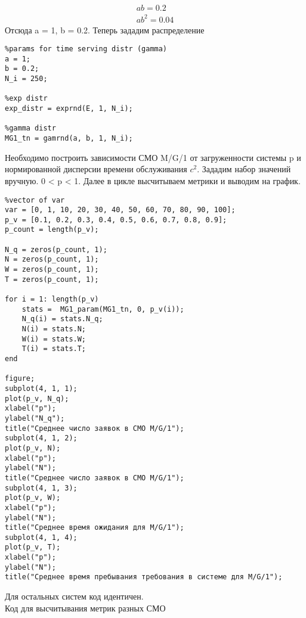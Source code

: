 \[
\begin{aligned}
ab = 0.2 \\
ab^2 = 0.04
\end{aligned}
\]
Отсюда a = 1, b = 0.2. Теперь зададим распределение 

\begin{lstlisting}
%params for time serving distr (gamma)
a = 1;
b = 0.2;
N_i = 250;

%exp distr
exp_distr = exprnd(E, 1, N_i);

%gamma distr
MG1_tn = gamrnd(a, b, 1, N_i);

\end{lstlisting}

Необходимо построить зависимости СМО M/G/1 от загруженности системы p и нормированной дисперсии времени обслуживания $c^2$. Зададим
набор значений вручную. 0 < p < 1. Далее в цикле высчитываем метрики и выводим на график.

\begin{lstlisting}
%vector of var
var = [0, 1, 10, 20, 30, 40, 50, 60, 70, 80, 90, 100];
p_v = [0.1, 0.2, 0.3, 0.4, 0.5, 0.6, 0.7, 0.8, 0.9];
p_count = length(p_v);

N_q = zeros(p_count, 1);
N = zeros(p_count, 1);
W = zeros(p_count, 1); 
T = zeros(p_count, 1);

for i = 1: length(p_v)
    stats =  MG1_param(MG1_tn, 0, p_v(i));
    N_q(i) = stats.N_q;
    N(i) = stats.N;
    W(i) = stats.W;
    T(i) = stats.T;
end

figure;
subplot(4, 1, 1);
plot(p_v, N_q);
xlabel("p");
ylabel("N_q");
title("Среднее число заявок в СМО M/G/1");
subplot(4, 1, 2);
plot(p_v, N);
xlabel("p");
ylabel("N");
title("Среднее число заявок в СМО M/G/1");
subplot(4, 1, 3);
plot(p_v, W);
xlabel("p");
ylabel("N");
title("Среднее время ожидания для M/G/1");
subplot(4, 1, 4);
plot(p_v, T);
xlabel("p");
ylabel("N");
title("Среднее время пребывания требования в системе для M/G/1");
\end{lstlisting}

Для остальных систем код идентичен. \\

Код для высчитывания метрик разных СМО

